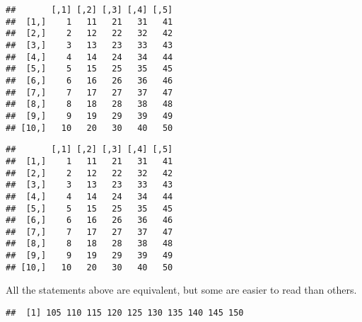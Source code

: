 \documentclass[paper=a4,10pt,div=17,headsepline,BCOR=12mm,twoside,open=right]{scrbook}\usepackage{knitr}
\begin{document}
\begin{knitrout}
\begin{kframe}
\begin{verbatim}
##       [,1] [,2] [,3] [,4] [,5]
##  [1,]    1   11   21   31   41
##  [2,]    2   12   22   32   42
##  [3,]    3   13   23   33   43
##  [4,]    4   14   24   34   44
##  [5,]    5   15   25   35   45
##  [6,]    6   16   26   36   46
##  [7,]    7   17   27   37   47
##  [8,]    8   18   28   38   48
##  [9,]    9   19   29   39   49
## [10,]   10   20   30   40   50
\end{verbatim}
\begin{alltt}
 \hlkwb{<-} \hlstd{(}\hlopt{:}\hlstd{,}  \hlstd{=} \hlstd{,}  \hlstd{=} \hlstd{)}
\end{alltt}
\begin{verbatim}
##       [,1] [,2] [,3] [,4] [,5]
##  [1,]    1   11   21   31   41
##  [2,]    2   12   22   32   42
##  [3,]    3   13   23   33   43
##  [4,]    4   14   24   34   44
##  [5,]    5   15   25   35   45
##  [6,]    6   16   26   36   46
##  [7,]    7   17   27   37   47
##  [8,]    8   18   28   38   48
##  [9,]    9   19   29   39   49
## [10,]   10   20   30   40   50
\end{verbatim}
\end{kframe}
\end{knitrout}

All the statements above are equivalent, but some are easier to read than others.

\begin{knitrout}\footnotesize
{}\color{fgcolor}\begin{kframe}
\begin{alltt}
 \hlkwb{<-} \hlstd{()} 
   \hlopt{:}
   \hlkwb{<-} 
     \hlopt{:}
     \hlkwb{<-}  \hlopt{+} 
\hlstd{\}}
\end{alltt}
\begin{verbatim}
##  [1] 105 110 115 120 125 130 135 140 145 150
\end{verbatim}
\end{kframe}
\end{knitrout}
\end{document}
